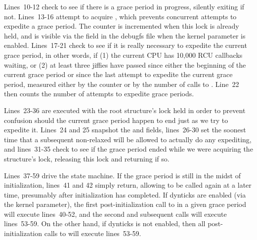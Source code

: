 Lines~10-12 check to see if there is a grace period in progress,
silently exiting if not.
Lines~13-16 attempt to acquire , which prevents concurrent
attempts to expedite a grace period.
The  counter is incremented when this lock is
already held, and is visible via the  field
in the  debugfs file when the  kernel
parameter is enabled.
Lines~17-21 check to see if it is really necessary to expedite the
current grace period, in other words, if (1) the current CPU has 10,000
RCU callbacks waiting, or (2) at least three jiffies have passed
since either the beginning of the current grace period or since the
last attempt to expedite the current grace period, measured either
by the  counter or by the number of calls to
.
Line~22 then counts the number of attempts to expedite grace periods.

Lines~23-36 are executed with the root  structure's lock
held in order to prevent confusion should the current grace period
happen to end just as we try to expedite it.
Lines~24 and 25 snapshot the  and  fields,
lines~26-30 set the soonest time that a subsequent non-relaxed
 will be allowed to actually do
any expediting, and lines~31-35 check to see if the grace period
ended while we were acquiring the  structure's lock,
releasing this lock and returning if so.

Lines~37-59 drive the  state machine.
If the grace period is still in the midst of initialization,
lines~41 and 42 simply return, allowing 
to be called again at a later time, presumably after initialization
has completed.
If dynticks are enabled (via the  kernel
parameter), the first post-initialization call
to  in a given grace period will
execute lines~40-52, and the second and subsequent calls will
execute lines~53-59.
On the other hand, if dynticks is not enabled, then all post-initialization
calls to  will execute lines~53-59.

